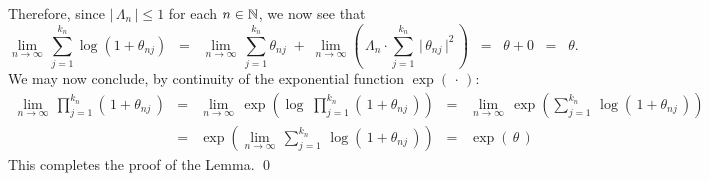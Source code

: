 Therefore, since $\left\vert\,\Lambda_{n}\,\right\vert \leq 1$ for each $n \in \mathbb{N}$, we now see that
\begin{equation*}
\lim_{n\rightarrow\infty}\,\sum_{j=1}^{k_{n}}\log(1 + \theta_{nj})
\;\; = \;\;
\lim_{n\rightarrow\infty}\,\sum_{j=1}^{k_{n}}\theta_{nj} \;+\; 
\lim_{n\rightarrow\infty}\left(\, \Lambda_{n}\cdot\sum_{j=1}^{k_{n}}\,\vert\,\theta_{nj}\,\vert^{2} \,\right)
\;\; = \;\; \theta + 0
\;\; = \;\; \theta.
\end{equation*}
We may now conclude, by continuity of the exponential function $\exp(\,\cdot\,)$:
\begin{eqnarray*}
\lim_{n\rightarrow\infty}\,\prod_{j=1}^{k_{n}}\left(\,1+\theta_{nj}\,\right)
&=& \lim_{n\rightarrow\infty}\,\exp\left(\log\;\prod_{j=1}^{k_{n}}\left(\,1+\theta_{nj}\,\right)\right)
\;\;=\;\; \lim_{n\rightarrow\infty}\,\exp\left(\sum_{j=1}^{k_{n}}\,\log\left(\,1+\theta_{nj}\,\right)\right)
\\
&=& \exp\left(\lim_{n\rightarrow\infty}\,\sum_{j=1}^{k_{n}}\,\log\left(\,1+\theta_{nj}\,\right)\right)
\;\;=\;\; \exp\left(\,\theta\,\right)
\end{eqnarray*}
This completes the proof of the Lemma.
\qed

